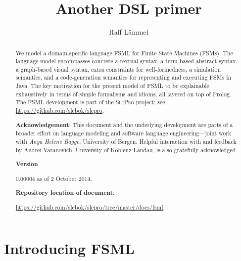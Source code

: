 \documentclass[preprint,authoryear,12pt]{noelsarticle}
\newcommand{\slepro}{\textsc{SlePro}}
\begin{document}
\begin{frontmatter}

\title{Another DSL primer}

\author{Ralf L\"ammel}

\address{Software Languages Team\\University of Koblenz-Landau, Germany}

\begin{abstract}
  We model a domain-specific language FSML for Finite State Machines
  (FSMs). The language model encompasses concrete a textual syntax, a
  term-based abstract syntax, a graph-based visual syntax, extra
  constraints for well-formedness, a simulation semantics, and a
  code-generation semantics for representing and executing FSMs in
  Java. The key motivation for the present model of FSML to be
  explainable exhaustively in terms of simple formalisms and idioms,
  all layered on top of Prolog. The FSML development is part of the
  \slepro{} project; see \url{https://github.com/slebok/slepro}.

\bigskip

\noindent
\textbf{Acknowledgement}: {\small This document and the underlying
  development are parts of a broader effort on language modeling and
  software language engineering---joint work with \emph{Anya Helene
    Bagge}, University of Bergen. Helpful interaction with and
  feedback by Andrei Varanovich, University of Koblenz-Landau, is also
  gratefully acknowledged.}

\medskip

\noindent
\textbf{Version}

0.00004 as of 2 October 2014.

\medskip

\noindent
\textbf{Repository location of document}: 

\url{https://github.com/slebok/slepro/tree/master/docs/fsml}.
\end{abstract}

\end{frontmatter}

\pagebreak


\tableofcontents

\pagebreak


\section{Introducing FSML}
\end{document}
